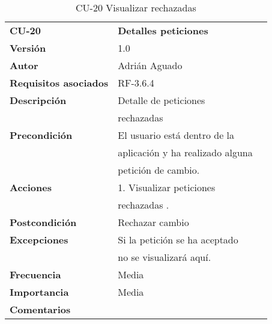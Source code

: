 \begin{table}
\begin{tabular}{llr}  
\toprule
\begin{minipage}[b]{0.24\columnwidth}\raggedright\strut
\textbf{CU-20}\strut
\end{minipage} & \begin{minipage}[b]{0.72\columnwidth}\raggedright\strut
\textbf{Detalles peticiones}\strut
\end{minipage}\tabularnewline
\cmidrule(r){1-2}
\textbf{Versión}       & 1.0           \\
\textbf{Autor}       & Adrián  Aguado    \\
\textbf{Requisitos asociados}       & RF-3.6.4  \\
\textbf{Descripción} & Detalle de peticiones \\
& rechazadas \\
\textbf{Precondición}  & El usuario está dentro de la \\
& aplicación y ha realizado alguna  \\
& petición de cambio.  \\
\textbf{Acciones} & 1. Visualizar peticiones\\
& rechazadas . \\
\textbf{Postcondición} &  Rechazar cambio \\
\textbf{Excepciones} &  Si la petición se ha aceptado   \\
&  no se visualizará aquí.   \\
\textbf{Frecuencia} & Media          \\
\textbf{Importancia} & Media           \\
\textbf{Comentarios } &   \\
\bottomrule
\end{tabular}
\caption{CU-20 Visualizar rechazadas} 
\end{table}

